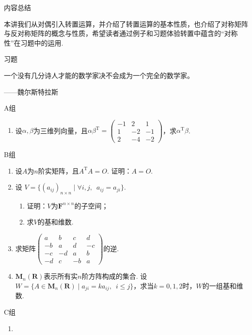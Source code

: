 \vspace{2ex}
\centerline{\heiti \Large 内容总结}

本讲我们从对偶引入转置运算，并介绍了转置运算的基本性质，也介绍了对称矩阵与反对称矩阵的概念与性质，希望读者通过例子和习题体验转置中蕴含的``对称性''在习题中的运用.

\vspace{2ex}
\centerline{\heiti \Large 习题}

\vspace{2ex}
{\kaishu 一个没有几分诗人才能的数学家决不会成为一个完全的数学家。}
\begin{flushright}
    \kaishu
    ——魏尔斯特拉斯
\end{flushright}

\centerline{\heiti A组}
\begin{enumerate}
    \item 设$\alpha,\beta$为三维列向量，且$\alpha\beta^\mathrm{T}=\begin{pmatrix}
                  -1 & 2  & 1  \\
                  1  & -2 & -1 \\
                  2  & -4 & -2
              \end{pmatrix}$，求$\alpha^\mathrm{T}\beta$.
\end{enumerate}

\centerline{\heiti B组}
\begin{enumerate}
    \item 设$A$为$n$阶实矩阵，且$A^\mathrm{T}A=O$. 证明：$A=O$.

    \item 设 $V=\{(a_{ij})_{n \times n} \mid \forall i,j,\enspace a_{ij}=a_{ji}\}$.
          \begin{enumerate}
              \item 证明：$V$为$\mathbf{F}^{n \times n}$的子空间；

              \item 求$V$的基和维数.
          \end{enumerate}

    \item 求矩阵$\begin{pmatrix}
                  a  & b  & c  & d  \\
                  -b & a  & d  & -c \\
                  -c & -d & a  & b  \\
                  -d & c  & -b & a
              \end{pmatrix}$的逆.

    \item $\mathbf{M}_n(\mathbf{R})$表示所有实$n$阶方阵构成的集合. 设$W=\{A\in \mathbf{M}_n(\mathbf{R}) \mid a_{ji}=ka_{ij},\enspace i \leqslant j\}$，求当$k=0,1,2$时，$W$的一组基和维数.
\end{enumerate}

\centerline{\heiti C组}
\begin{enumerate}
    \item
\end{enumerate}
